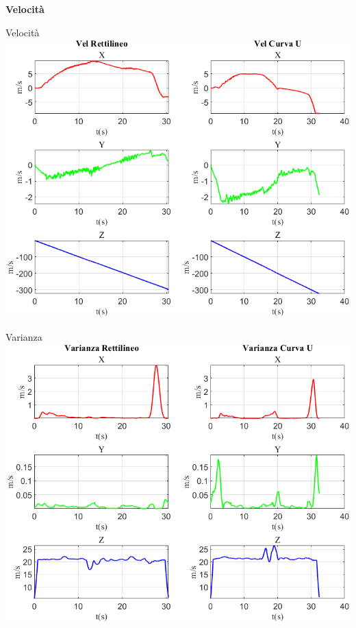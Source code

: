 \documentclass[beamer]{standalone}
\begin{document}
	\begin{frame}
		\color{blue}\centering\Huge{\textbf{Velocità}}	
	\end{frame}
	
	\begin{frame}{{Velocità}}
		\centering\includegraphics[height=.8\textheight]{figure/Vel/Vel}
	\end{frame}
	
%	
	
	\begin{frame}{{Varianza}}
		\centering\includegraphics[height=.8\textheight]{figure/Vel/Varianza}
	\end{frame}
	
\end{document}
